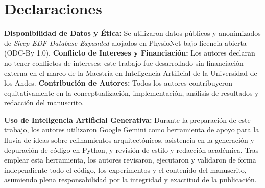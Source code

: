 \documentclass[conference]{IEEEtran}
\begin{document}
\section*{Declaraciones}
\textbf{Disponibilidad de Datos y Ética:} Se utilizaron datos públicos y anonimizados de \textit{Sleep-EDF Database Expanded} alojados en PhysioNet bajo licencia abierta (ODC-By 1.0). \textbf{Conflicto de Intereses y Financiación:} Los autores declaran no tener conflictos de intereses; este trabajo fue desarrollado sin financiación externa en el marco de la Maestría en Inteligencia Artificial de la Universidad de los Andes. \textbf{Contribución de Autores:} Todos los autores contribuyeron equitativamente en la conceptualización, implementación, análisis de resultados y redacción del manuscrito.

\textbf{Uso de Inteligencia Artificial Generativa:} Durante la preparación de este trabajo, los autores utilizaron Google Gemini como herramienta de apoyo para la lluvia de ideas sobre refinamientos arquitectónicos, asistencia en la generación y depuración de código en Python, y revisión de estilo y redacción académica. Tras emplear esta herramienta, los autores revisaron, ejecutaron y validaron de forma independiente todo el código, los experimentos y el contenido del manuscrito, asumiendo plena responsabilidad por la integridad y exactitud de la publicación.
\end{document}
